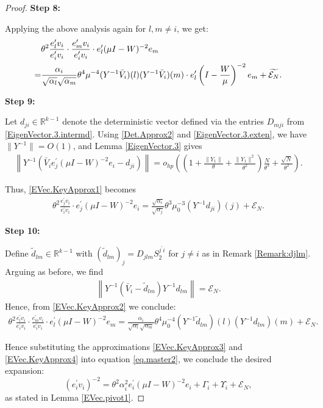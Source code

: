 \documentclass[10pt,a4paper]{amsart}
\begin{document}
\begin{proof}
\textbf{Step 8:}

Applying the above analysis again for \( l,m \ne i \), we get:
\begin{align}
& \theta^2 \frac{e_l^\prime v_i}{e_i^\prime v_i} \cdot \frac{e_m^\prime v_i}{e_i^\prime v_i} \cdot e_l^\prime (\mu I - W)^{-2} e_m \notag \\
= & \frac{\alpha_i}{\sqrt{\alpha_l}\sqrt{\alpha_m}}\theta^4 \mu^{-4} (Y^{-1} \bar V_i)(l) (Y^{-1} \bar V_i)(m) \cdot e_l^\prime \left(I - \frac{W}{\mu}\right)^{-2} e_m + \widetilde{\mathcal{E}_N}. \label{EVec.KeyApprox2}
\end{align}

\textbf{Step 9:}

Let \( d_{ji} \in \mathbb{R}^{k-1} \) denote the deterministic vector defined via the entries \( D_{mji} \) from \eqref{EigenVector.3.intermd}. Using \eqref{Det.Approx2} and \eqref{EigenVector.3.exten}, we have \( \|Y^{-1}\| = O(1) \), and Lemma \ref{EigenVector.3} gives
\begin{align}
\left\| Y^{-1} \left( \bar V_i e_j^\prime (\mu I - W)^{-2} e_i - d_{ji} \right) \right\| 
= o_{hp} \left( \left(1 + \frac{\|Y_1\|}{\theta} + \frac{\|Y_1\|^2}{\theta^2} \right) \frac{N}{\theta^3} + \frac{\sqrt{N}}{\theta^2} \right).
\end{align}

Thus, \eqref{EVec.KeyApprox1} becomes
\begin{align}
\theta^2 \frac{e_j^\prime v_i}{e_i^\prime v_i} \cdot e_j^\prime (\mu I - W)^{-2} e_i 
= \frac{\sqrt{\alpha_i}}{\sqrt{\alpha_j}}\theta^3 \mu_0^{-3} (Y^{-1} d_{ji})(j) + \mathcal{E}_N. \label{EVec.KeyApprox3}
\end{align}

\textbf{Step 10:}

Define \( \tilde d_{lm} \in \mathbb{R}^{k-1} \) with $(\tilde d_{lm})_{j}= D_{jlm} S_2^{j^\prime i}$ for $j\neq i$ as in Remark \ref{Remark:djlm}. Arguing as before, we find
\begin{align}
\left\| Y^{-1}(\bar V_i - \tilde d_{lm}) Y^{-1} d_{lm} \right\| = \mathcal{E}_N.
\end{align}
Hence, from \eqref{EVec.KeyApprox2} we conclude:
\begin{align}
\theta^2 \frac{e_l^\prime v_i}{e_i^\prime v_i} \cdot \frac{e_m^\prime v_i}{e_i^\prime v_i} \cdot e_l^\prime (\mu I - W)^{-2} e_m 
=\frac{\alpha_i}{\sqrt{\alpha_l}\sqrt{\alpha_m}} \theta^4 \mu_0^{-4} (Y^{-1} \tilde d_{lm})(l) (Y^{-1} d_{lm})(m) + \mathcal{E}_N. \label{EVec.KeyApprox4}
\end{align}


Hence substituting the approximations \eqref{EVec.KeyApprox3} and \eqref{EVec.KeyApprox4} into equation \eqref{eq.master2}, we conclude the desired expansion:
\[
(e_i^\prime v_i)^{-2} = \theta^2 \alpha_i^2 e_i^\prime (\mu I - W)^{-2} e_i + \Gamma_i + \Upsilon_i + \mathcal{E}_N,
\]
as stated in Lemma \ref{EVec.pivot1}.
\end{proof}
\end{document}
